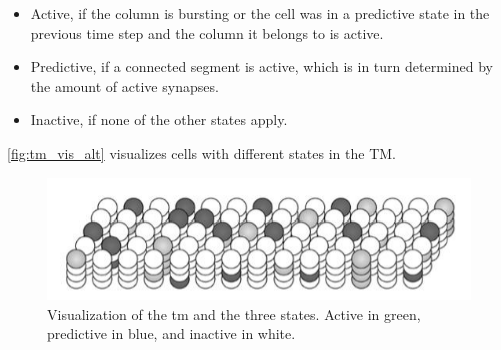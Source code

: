 \begin{itemize}
    \item Active, if the column is bursting or the cell was in a predictive state in the previous time step and the column it belongs to is active.
    \item Predictive, if a connected segment is active, which is in turn determined by the amount of active synapses.
    \item Inactive, if none of the other states apply.
\end{itemize}
\autoref{fig:tm_vis_alt} visualizes cells with different states in the TM.
\begin{figure}[H]
    \centering
    \includegraphics[width=\linewidth]{resources/related_works/tm_vis_alt}
    \caption[Visualization of Cell States]{Visualization of the \gls*{tm} and the three states. Active in green, predictive in blue, and inactive in white.}
    \label{fig:tm_vis_alt}
\end{figure}

